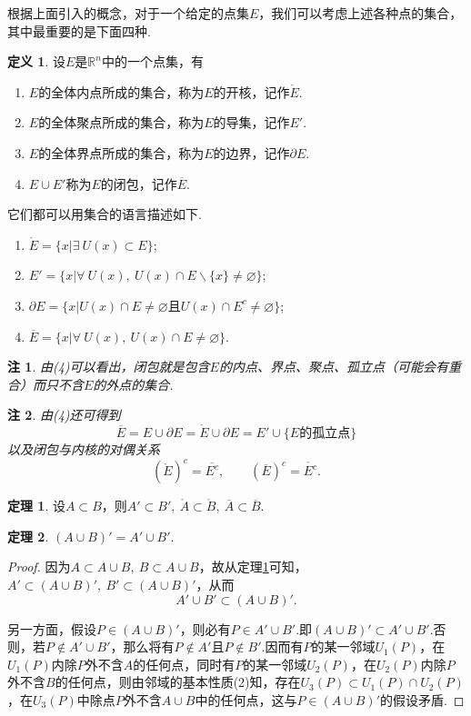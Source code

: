 \documentclass[lang=cn,12pt]{ctexart}
\theoremstyle{definition}
\newtheorem{definition}{定义}
\newtheorem{theorem}{定理}
\theoremstyle{plain}
\newtheorem*{remark}{注}
\begin{document}
根据上面引入的概念，对于一个给定的点集$E$，我们可以考虑上述各种点的集合，其中最重要的是下面四种.
\begin{definition}
	设$E$是$\mathbb{R}^n$中的一个点集，有
	\begin{enumerate}
		\item $E$的全体内点所成的集合，称为$E$的{\heiti 开核}，记作$\mathring{E}$.
		\item $E$的全体聚点所成的集合，称为$E$的{\heiti 导集}，记作$E'$.
		\item $E$的全体界点所成的集合，称为$E$的{\heiti 边界}，记作$\partial E$.
		\item $E\cup E'$称为$E$的{\heiti 闭包}，记作$\overline{E}$.
	\end{enumerate}
\end{definition}
它们都可以用集合的语言描述如下.
\begin{enumerate}
	\item $\mathring{E}=\{x|\exists\ U(x)\subset E\}$;
	\item $E'=\{x|\forall\ U(x),\ U(x)\cap E\backslash\{x\}\neq\varnothing\}$;
	\item $\partial E=\{x|U(x)\cap E\neq\varnothing\text{且}U(x)\cap E^c\neq\varnothing\}$;
	\item $\overline{E}=\{x|\forall\ U(x),\ U(x)\cap E\neq\varnothing\}$.
\end{enumerate}
\begin{remark}
	由(4)可以看出，闭包就是包含$E$的内点、界点、聚点、孤立点（可能会有重合）而只不含$E$的外点的集合.
\end{remark}
\begin{remark}
	由(4)还可得到
	$$\overline{E}=E\cup\partial E=\mathring{E}\cup\partial E=E'\cup\{E\text{的孤立点}\}$$
	以及闭包与内核的对偶关系
	$$(\mathring{E})^c=\overline{E^c},\qquad (\overline{E})^c=\mathring{E^c}.$$
\end{remark}
\begin{theorem}\label{baohanyu}
	设$A\subset B$，则$A'\subset B',\ \mathring{A}\subset\mathring{B},\ \overline{A}\subset\overline{B}$.
\end{theorem}
\begin{theorem}\label{bing}
	$(A\cup B)'=A'\cup B'$.
\end{theorem}
\begin{proof}
	因为$A\subset A\cup B,\ B\subset A\cup B$，故从定理\ref{baohanyu}可知，$A'\subset (A\cup B)',\ B'\subset (A\cup B)'$，从而
	$$A'\cup B'\subset(A\cup B)'.$$
	
	另一方面，假设$P\in(A\cup B)'$，则必有$P\in A'\cup B'$.即$(A\cup B)'\subset A'\cup B'$.否则，若$P\notin A'\cup B'$，那么将有$P\notin A'$且$P\notin B'$.因而有$P$的某一邻域$U_1(P)$，在$U_1(P)$内除$P$外不含$A$的任何点，同时有$P$的某一邻域$U_2(P)$，在$U_2(P)$内除$P$外不含$B$的任何点，则由邻域的基本性质(2)知，存在$U_3(P)\subset U_1(P)\cap U_2(P)$，在$U_3(P)$中除点$P$外不含$A\cup B$中的任何点，这与$P\in(A\cup B)'$的假设矛盾.
\end{proof}
\end{document}
